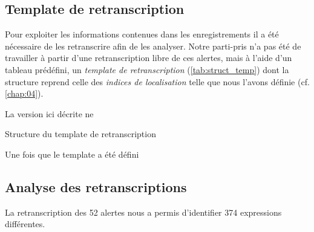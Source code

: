 \subsection{Template de retranscription}

Pour exploiter les informations contenues dans les enregistrements il
a été nécessaire de les retranscrire afin de les analyser.
%
Notre parti-pris n'a pas été de travailler à partir d'une
retranscription libre de ces alertes, mais à l'aide d'un tableau
prédéfini, un \emph{template de retranscription}
(\autoref{tab:struct_temp}) dont la structure reprend celle des
\emph{indices de localisation} telle que nous l'avons définie
(cf. \autoref{chap:04}).

La version ici décrite ne 

\begin{table}
  \centering
  
  \caption{Structure du template de retranscription}
  \label{tab:struct_temp}
\end{table}

Une fois que le template a été défini

\subsection{Analyse des retranscriptions}

La retranscription des 52 alertes nous a permis d'identifier 374
expressions différentes.

